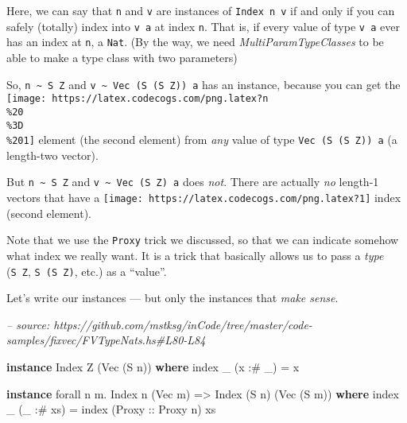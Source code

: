 \documentclass[]{article}
\newenvironment{Shaded}{}{}
\newcommand{\CommentTok}[1]{\textcolor[rgb]{0.38,0.63,0.69}{\textit{#1}}}
\newcommand{\DataTypeTok}[1]{\textcolor[rgb]{0.56,0.13,0.00}{#1}}
\newcommand{\FunctionTok}[1]{\textcolor[rgb]{0.02,0.16,0.49}{#1}}
\newcommand{\KeywordTok}[1]{\textcolor[rgb]{0.00,0.44,0.13}{\textbf{#1}}}
\newcommand{\NormalTok}[1]{#1}
\newcommand{\OtherTok}[1]{\textcolor[rgb]{0.00,0.44,0.13}{#1}}
\begin{document}
Here, we can say that \texttt{n} and \texttt{v} are instances of
\texttt{Index\ n\ v} if and only if you can safely (totally) index into
\texttt{v\ a} at index \texttt{n}. That is, if every value of type \texttt{v\ a}
ever has an index at \texttt{n}, a \texttt{Nat}. (By the way, we need
\emph{MultiParamTypeClasses} to be able to make a type class with two
parameters)

So, \texttt{n\ \textasciitilde{}\ S\ Z} and
\texttt{v\ \textasciitilde{}\ Vec\ (S\ (S\ Z))\ a} has an instance, because you
can get the
\texttt{[image: https://latex.codecogs.com/png.latex?n\\\%20\\\%3D\\\%201]} element
(the second element) from \emph{any} value of type \texttt{Vec\ (S\ (S\ Z))\ a}
(a length-two vector).

But \texttt{n\ \textasciitilde{}\ S\ Z} and
\texttt{v\ \textasciitilde{}\ Vec\ (S\ Z)\ a} does \emph{not}. There are
actually \emph{no} length-1 vectors that have a
\texttt{[image: https://latex.codecogs.com/png.latex?1]} index (second element).

Note that we use the \texttt{Proxy} trick we discussed, so that we can indicate
somehow what index we really want. It is a trick that basically allows us to
pass a \emph{type} (\texttt{S\ Z}, \texttt{S\ (S\ Z)}, etc.) as a ``value''.

Let's write our instances --- but only the instances that \emph{make sense}.

\begin{Shaded}
\begin{Highlighting}[]
\CommentTok{-- source: https://github.com/mstksg/inCode/tree/master/code-samples/fixvec/FVTypeNats.hs#L80-L84}

\KeywordTok{instance} \DataTypeTok{Index} \DataTypeTok{Z}\NormalTok{ (}\DataTypeTok{Vec}\NormalTok{ (}\DataTypeTok{S}\NormalTok{ n)) }\KeywordTok{where}
\NormalTok{    index _ (x }\FunctionTok{:#}\NormalTok{ _) }\FunctionTok{=}\NormalTok{ x}

\KeywordTok{instance}\NormalTok{ forall n m}\FunctionTok{.} \DataTypeTok{Index}\NormalTok{ n (}\DataTypeTok{Vec}\NormalTok{ m) }\OtherTok{=>} \DataTypeTok{Index}\NormalTok{ (}\DataTypeTok{S}\NormalTok{ n) (}\DataTypeTok{Vec}\NormalTok{ (}\DataTypeTok{S}\NormalTok{ m)) }\KeywordTok{where}
\NormalTok{    index _ (_ }\FunctionTok{:#}\NormalTok{ xs) }\FunctionTok{=}\NormalTok{ index (}\DataTypeTok{Proxy}\OtherTok{ ::} \DataTypeTok{Proxy}\NormalTok{ n) xs}
\end{Highlighting}
\end{Shaded}
\end{document}
